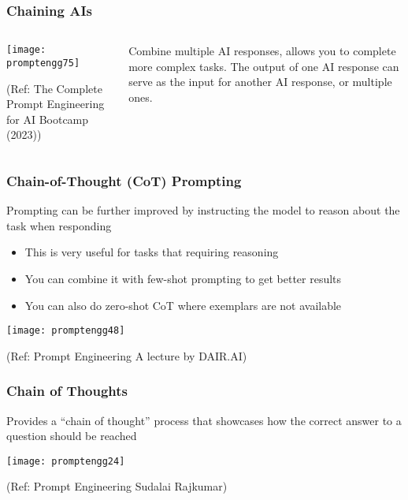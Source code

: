 \begin{frame}[fragile]\frametitle{Chaining AIs}

\begin{columns}
    \begin{column}[T]{0.6\linewidth}
		\begin{center}
		\texttt{[image: promptengg75]}

		{\tiny (Ref: The Complete Prompt Engineering for AI Bootcamp (2023))}
		\end{center}	
    \end{column}
    \begin{column}[T]{0.4\linewidth}
		Combine multiple AI responses, allows you to complete more complex tasks.
		The output of one AI response can serve as the input for another AI response, or multiple ones.
    \end{column}
  \end{columns}
\end{frame}


\begin{frame}[fragile]\frametitle{Chain-of-Thought (CoT) Prompting}

Prompting can be further improved by instructing the 
model to reason about the task when responding

\begin{itemize}
\item This is very useful for tasks that requiring reasoning 
\item You can combine it with few-shot prompting to get better results 
\item You can also do zero-shot CoT where exemplars are not available
\end{itemize}	


\begin{center}
\texttt{[image: promptengg48]}

{\tiny (Ref: Prompt Engineering A lecture by DAIR.AI)}

\end{center}	

\end{frame}

\begin{frame}[fragile]\frametitle{Chain of Thoughts}

Provides a “chain of thought” process that 
showcases how the correct answer to a question should be reached

\begin{center}
\texttt{[image: promptengg24]}

{\tiny (Ref: Prompt Engineering Sudalai Rajkumar)}

\end{center}		

\end{frame}

